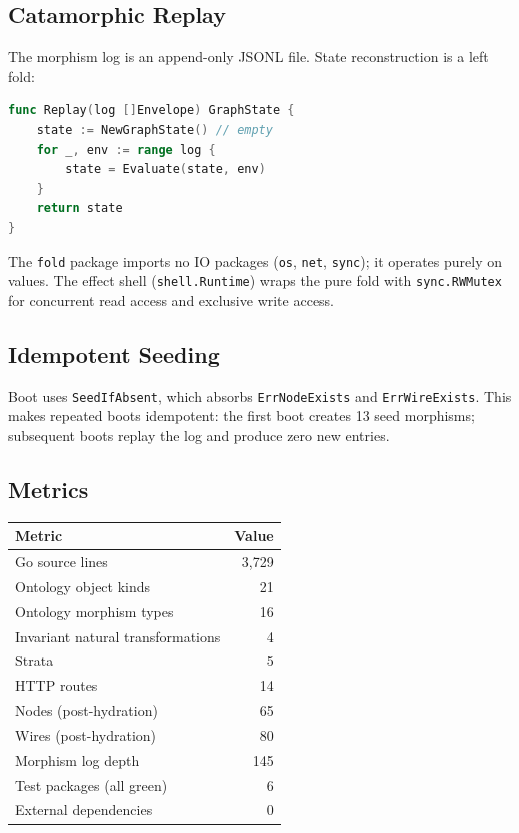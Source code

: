 \documentclass[submission,copyright,creativecommons]{eptcs}
\begin{document}
\subsection{Catamorphic Replay}

The morphism log is an append-only JSONL file. State reconstruction is a left
fold:

\begin{lstlisting}[language=Go,caption={Pure replay (simplified)}]
func Replay(log []Envelope) GraphState {
    state := NewGraphState() // empty
    for _, env := range log {
        state = Evaluate(state, env)
    }
    return state
}
\end{lstlisting}

The \texttt{fold} package imports no IO packages (\texttt{os}, \texttt{net},
\texttt{sync}); it operates purely on values. The effect shell
(\texttt{shell.Runtime}) wraps the pure fold with \texttt{sync.RWMutex} for
concurrent read access and exclusive write access.

\subsection{Idempotent Seeding}

Boot uses \texttt{SeedIfAbsent}, which absorbs \texttt{ErrNodeExists} and
\texttt{ErrWireExists}. This makes repeated boots idempotent: the first boot
creates 13 seed morphisms; subsequent boots replay the log and produce zero
new entries.

\subsection{Metrics}

\begin{center}
\begin{tabular}{@{}lr@{}}
\toprule
Metric & Value \\
\midrule
Go source lines & 3{,}729 \\
Ontology object kinds & 21 \\
Ontology morphism types & 16 \\
Invariant natural transformations & 4 \\
Strata & 5 \\
HTTP routes & 14 \\
Nodes (post-hydration) & 65 \\
Wires (post-hydration) & 80 \\
Morphism log depth & 145 \\
Test packages (all green) & 6 \\
External dependencies & 0 \\
\bottomrule
\end{tabular}
\end{center}
\end{document}
